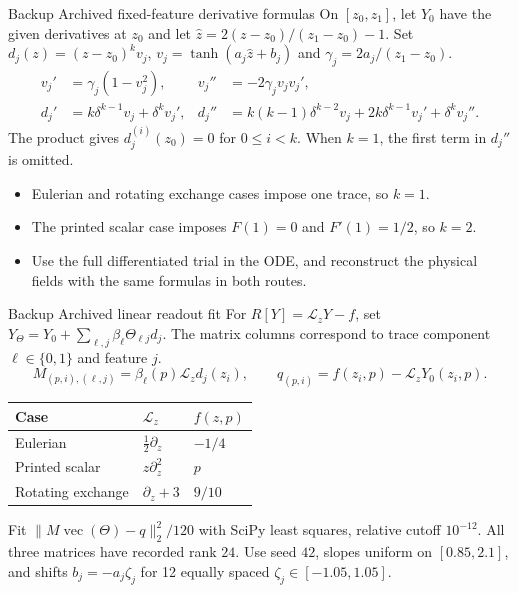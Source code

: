 \documentclass[aspectratio=169,11pt]{beamer}
\begin{document}
\appendix

\begin{frame}[t]{Backup \enspace Archived fixed-feature derivative formulas}
\small
On $[z_0,z_1]$, let $Y_0$ have the given derivatives at $z_0$ and
let $\widehat z=2(z-z_0)/(z_1-z_0)-1$. Set
$d_j(z)=(z-z_0)^k v_j$, $v_j=\tanh(a_j\widehat z+b_j)$ and
$\gamma_j=2a_j/(z_1-z_0)$.
\begin{align*}
 v_j' &= \gamma_j(1-v_j^2),&
 v_j''&=-2\gamma_j v_jv_j',\\
 d_j' &= k\delta^{k-1}v_j+\delta^kv_j',&
 d_j''&=k(k-1)\delta^{k-2}v_j+2k\delta^{k-1}v_j'+\delta^kv_j''.
\end{align*}
The product gives $d_j^{(i)}(z_0)=0$ for $0\leq i<k$.
When $k=1$, the first term in $d_j''$ is omitted.
\begin{itemize}
\item Eulerian and rotating exchange cases impose one trace, so $k=1$.
\item The printed scalar case imposes $F(1)=0$ and $F'(1)=1/2$, so $k=2$.
\item Use the full differentiated trial in the ODE, and reconstruct the
physical fields with the same formulas in both routes.
\end{itemize}
\end{frame}

\begin{frame}[t]{Backup \enspace Archived linear readout fit}
\small
For $R[Y]=\mathcal L_zY-f$, set
$Y_\Theta=Y_0+\sum_{\ell,j}\beta_\ell\Theta_{\ell j}d_j$. The matrix
columns correspond to trace component $\ell\in\{0,1\}$ and feature $j$.
\[
 M_{(p,i),(\ell,j)}=\beta_\ell(p)\mathcal L_z d_j(z_i),\qquad
 q_{(p,i)}=f(z_i,p)-\mathcal L_zY_0(z_i,p).
\]
\begin{center}
\renewcommand{\arraystretch}{1.2}
\begin{tabular}{@{}lll@{}}
\toprule
Case & $\mathcal L_z$ & $f(z,p)$ \\
\midrule
Eulerian & $\tfrac12\partial_z$ & $-1/4$ \\
Printed scalar & $z\partial_z^2$ & $p$ \\
Rotating exchange & $\partial_z+3$ & $9/10$ \\
\bottomrule
\end{tabular}
\end{center}
Fit $\|M\operatorname{vec}(\Theta)-q\|_2^2/120$ with SciPy least squares,
relative cutoff $10^{-12}$. All three matrices have recorded rank $24$.
Use seed $42$, slopes uniform on $[0.85,2.1]$, and shifts
$b_j=-a_j\zeta_j$ for 12 equally spaced $\zeta_j\in[-1.05,1.05]$.
\end{frame}
\end{document}
